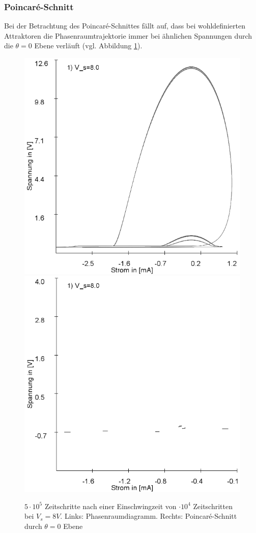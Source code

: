 \documentclass{scrartcl}
\begin{document}
\subsubsection{Poincaré-Schnitt}
Bei der Betrachtung des Poincaré-Schnittes fällt auf, dass bei wohldefinierten Attraktoren die Phasenraumtrajektorie immer bei ähnlichen Spannungen durch die $\theta=0$ Ebene verläuft (vgl. Abbildung \ref{fig:ldr-poin1}).
\begin{figure}[!htbp]
\includegraphics[scale=0.4]{schwing-500k-nach-10k-8V-phase}
\includegraphics[scale=0.4]{schwing-500k-nach-10k-8V-poin}
\caption{$5\cdot10^5$ Zeitschritte nach einer Einschwingzeit von $\cdot10^4$ Zeitschritten bei $V_s=8V$. Links: Phasenraumdiagramm. Rechts: Poincaré-Schnitt durch $\theta=0$ Ebene}
\label{fig:ldr-poin1}
\end{figure}
\end{document}
